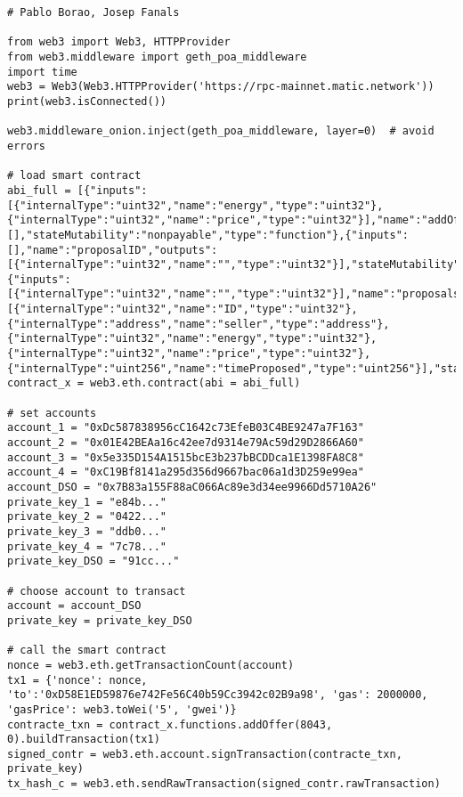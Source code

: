 \begin{lstlisting}[caption={Python code to call the smart contract}]
        # Pablo Borao, Josep Fanals

from web3 import Web3, HTTPProvider
from web3.middleware import geth_poa_middleware
import time
web3 = Web3(Web3.HTTPProvider('https://rpc-mainnet.matic.network'))
print(web3.isConnected())

web3.middleware_onion.inject(geth_poa_middleware, layer=0)  # avoid errors

# load smart contract
abi_full = [{"inputs":[{"internalType":"uint32","name":"energy","type":"uint32"},{"internalType":"uint32","name":"price","type":"uint32"}],"name":"addOffer","outputs":[],"stateMutability":"nonpayable","type":"function"},{"inputs":[],"name":"proposalID","outputs":[{"internalType":"uint32","name":"","type":"uint32"}],"stateMutability":"view","type":"function"},{"inputs":[{"internalType":"uint32","name":"","type":"uint32"}],"name":"proposals","outputs":[{"internalType":"uint32","name":"ID","type":"uint32"},{"internalType":"address","name":"seller","type":"address"},{"internalType":"uint32","name":"energy","type":"uint32"},{"internalType":"uint32","name":"price","type":"uint32"},{"internalType":"uint256","name":"timeProposed","type":"uint256"}],"stateMutability":"view","type":"function"}]
contract_x = web3.eth.contract(abi = abi_full)

# set accounts
account_1 = "0xDc587838956cC1642c73EfeB03C4BE9247a7F163"
account_2 = "0x01E42BEAa16c42ee7d9314e79Ac59d29D2866A60"
account_3 = "0x5e335D154A1515bcE3b237bBCDDca1E1398FA8C8"
account_4 = "0xC19Bf8141a295d356d9667bac06a1d3D259e99ea"
account_DSO = "0x7B83a155F88aC066Ac89e3d34ee9966Dd5710A26"
private_key_1 = "e84b..."
private_key_2 = "0422..."
private_key_3 = "ddb0..."
private_key_4 = "7c78..."
private_key_DSO = "91cc..."

# choose account to transact
account = account_DSO
private_key = private_key_DSO

# call the smart contract
nonce = web3.eth.getTransactionCount(account)
tx1 = {'nonce': nonce, 'to':'0xD58E1ED59876e742Fe56C40b59Cc3942c02B9a98', 'gas': 2000000, 'gasPrice': web3.toWei('5', 'gwei')} 
contracte_txn = contract_x.functions.addOffer(8043, 0).buildTransaction(tx1) 
signed_contr = web3.eth.account.signTransaction(contracte_txn, private_key)
tx_hash_c = web3.eth.sendRawTransaction(signed_contr.rawTransaction)
\end{lstlisting}

